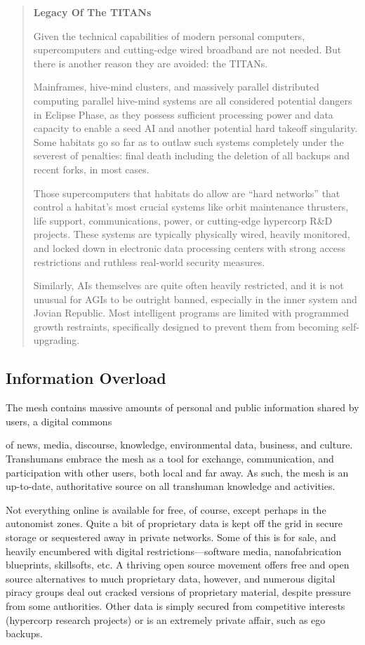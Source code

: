 \begin{quotation} \textbf{Legacy Of The TITANs} 

Given the technical capabilities of modern personal computers, supercomputers and cutting-edge wired broadband are not needed. But there is another reason they are avoided: the TITANs. 

Mainframes, hive-mind clusters, and massively parallel distributed computing parallel hive-mind systems are all considered potential dangers in Eclipse Phase, as they possess sufficient processing power and data capacity to enable a seed AI and another potential hard takeoff singularity. Some habitats go so far as to outlaw such systems completely under the severest of penalties: final death including the deletion of all backups and recent forks, in most cases. 

Those supercomputers that habitats do allow are “hard networks” that control a habitat’s most crucial systems like orbit maintenance thrusters, life support, communications, power, or cutting-edge hypercorp R\&D projects. These systems are typically physically wired, heavily monitored, and locked down in electronic data processing centers with strong access restrictions and ruthless real-world security measures. 

Similarly, AIs themselves are quite often heavily restricted, and it is not unusual for AGIs to be outright banned, especially in the inner system and Jovian Republic. Most intelligent programs are limited with programmed growth restraints, specifically designed to prevent them from becoming self-upgrading. \end{quotation} 

\subsection{Information Overload} 

The mesh contains massive amounts of personal and public information shared by users, a digital commons 

of news, media, discourse, knowledge, environmental data, business, and culture. Transhumans embrace the mesh as a tool for exchange, communication, and participation with other users, both local and far away. As such, the mesh is an up-to-date, authoritative source on all transhuman knowledge and activities. 

Not everything online is available for free, of course, except perhaps in the autonomist zones. Quite a bit of proprietary data is kept off the grid in secure storage or sequestered away in private networks. Some of this is for sale, and heavily encumbered with digital restrictions—software media, nanofabrication blueprints, skillsofts, etc. A thriving open source movement offers free and open source alternatives to much proprietary data, however, and numerous digital piracy groups deal out cracked versions of proprietary material, despite pressure from some authorities. Other data is simply secured from competitive interests (hypercorp research projects) or is an extremely private affair, such as ego backups. 

